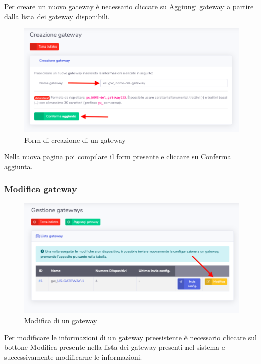 		Per creare un nuovo gateway è necessario cliccare su Aggiungi gateway a partire dalla lista dei gateway disponibili.

		\begin{figure}[H]
		\centering
		\includegraphics[scale=0.600]{res/images/admin/creazGateway.png}
		\caption{Form di creazione di un gateway}
	\end{figure}


		Nella nuova pagina poi compilare il form presente e cliccare su Conferma aggiunta. 

	\subsubsection{Modifica gateway}

		\begin{figure}[H]
		\centering
		\includegraphics[scale=0.600]{res/images/admin/selModGateway.png}
		\caption{Modifica di un gateway}
	\end{figure}

		Per modificare le informazioni di un gateway preesistente è necessario cliccare sul bottone Modifica presente nella lista dei gateway presenti nel sistema e successivamente modificarne le informazioni.

